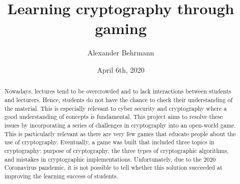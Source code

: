 \documentclass{l4proj}
\begin{document}
\title{Learning cryptography through gaming}
\author{Alexander Behrmann}
\date{April 6th, 2020}

\maketitle

\begin{abstract}

Nowadays, lectures tend to be overcrowded and to lack interactions between students
and lecturers. Hence, students do not have the chance to check their understanding
of the material. This is especially relevant to cyber security and cryptography 
where a good understanding of concepts is fundamental. 
This project aims to resolve these issues by incorporating a series of challenges 
in cryptography into an open-world game. 
This is particularly relevant as there are very few games 
that educate people about the use of cryptography.
Eventually, a game was built that included three topics in cryptography:
purpose of cryptography, the three types of cryptographic algorithms, and
mistakes in cryptographic implementations.
Unfortunately, due to the 2020 Coronavirus pandemic, it is not possible to tell
whether this solution succeeded at improving the learning success of students.

\end{abstract}


%
%
%
\educationalconsent
\def\consentname{Alexander Behrmann} %
\def\consentdate{20 March 2020} %

\tableofcontents
\end{document}

